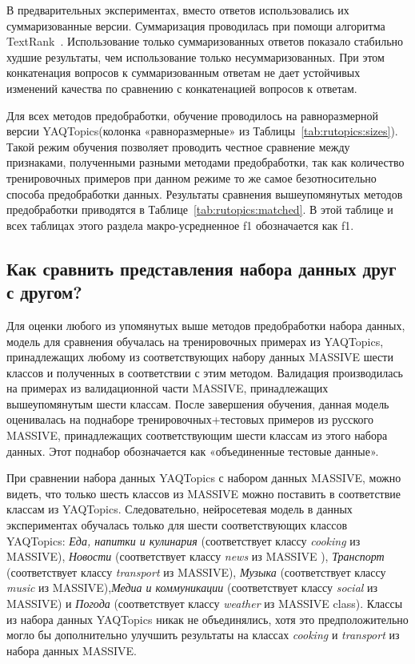 В предварительных экспериментах, вместо ответов использовались их суммаризованные версии. Суммаризация проводилась при помощи алгоритма TextRank~\cite{summarizer}. Использование только суммаризованных ответов показало стабильно худшие результаты, чем использование только несуммаризованных. При этом конкатенация вопросов к суммаризованным ответам не дает устойчивых изменений качества по сравнению с конкатенацией вопросов к ответам.

Для всех методов предобработки, обучение проводилось на равноразмерной версии {YAQTopics}(колонка «равноразмерные» из Таблицы~\ref{tab:rutopics:sizes}).
Такой режим обучения позволяет проводить честное сравнение между признаками, полученными разными методами предобработки, так как количество тренировочных примеров при данном режиме то же самое безотносительно способа предобработки данных. Результаты сравнения вышеупомянутых методов предобработки приводятся в Таблице~\ref{tab:rutopics:matched}. В этой таблице и всех таблицах этого раздела макро-усредненное f1 обозначается как f1.
 \subsection{Как сравнить представления набора данных друг с другом?}
Для оценки любого из упомянутых выше методов предобработки набора данных, модель для сравнения обучалась на тренировочных примерах из {YAQTopics}, принадлежащих любому из соответствующих набору данных {MASSIVE} шести классов и полученных в соответствии с этим методом. Валидация производилась на примерах из валидационной части MASSIVE, принадлежащих вышеупомянутым шести классам. После завершения обучения, данная модель оценивалась на поднаборе тренировочных+тестовых примеров из русского {MASSIVE}, принадлежащих соответствующим шести классам из этого набора данных. Этот поднабор обозначается как «объединенные тестовые данные».

При сравнении набора данных {YAQTopics} с набором данных {MASSIVE}, можно видеть, что только шесть классов из {MASSIVE} можно поставить в соответствие классам из  {YAQTopics}. Следовательно, нейросетевая модель в данных экспериментах обучалась только для шести соответствующих классов {YAQTopics}: \textit{Еда, напитки и кулинария} (соответствует классу \textit{cooking} из {MASSIVE}), \textit{Новости} (соответствует классу \textit{news} из {MASSIVE} ), \textit{Транспорт} (соответствует классу \textit{transport} из {MASSIVE}), \textit{Музыка} (соответствует классу \textit{music} из {MASSIVE}),\textit{Медиа и коммуникации} (соответствует классу \textit{social} из {MASSIVE}) и \textit{Погода} (соответствует классу \textit{weather} из {MASSIVE} class). Классы из набора данных {YAQTopics} никак не объединялись, хотя это предположительно могло бы дополнительно улучшить результаты на классах \textit{cooking} и \textit{transport} из набора данных {MASSIVE}.

